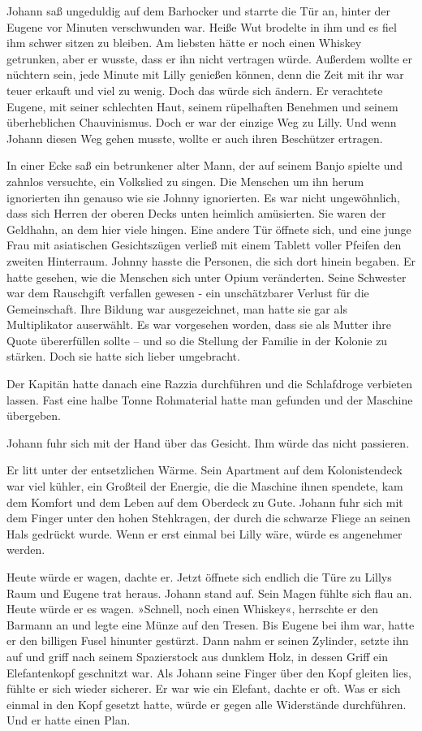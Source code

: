 Johann saß ungeduldig auf dem Barhocker und starrte die Tür an,
hinter der Eugene vor Minuten verschwunden war. Heiße Wut brodelte
in ihm und es fiel ihm schwer sitzen zu bleiben. Am liebsten hätte
er noch einen Whiskey getrunken, aber er wusste, dass er ihn nicht
vertragen würde. Außerdem wollte er nüchtern sein, jede Minute mit
Lilly genießen können, denn die Zeit mit ihr war teuer erkauft und
viel zu wenig. Doch das würde sich ändern. Er verachtete Eugene,
mit seiner schlechten Haut, seinem rüpelhaften Benehmen und seinem
überheblichen Chauvinismus. Doch er war der einzige Weg zu Lilly.
Und wenn Johann diesen Weg gehen musste, wollte er auch ihren
Beschützer ertragen.

In einer Ecke saß ein betrunkener alter Mann, der auf seinem Banjo
spielte und zahnlos versuchte, ein Volkslied zu singen. Die
Menschen um ihn herum ignorierten ihn genauso wie sie Johnny
ignorierten. Es war nicht ungewöhnlich, dass sich Herren der oberen
Decks unten heimlich amüsierten. Sie waren der Geldhahn, an dem
hier viele hingen. Eine andere Tür öffnete sich, und eine junge
Frau mit asiatischen Gesichtszügen verließ mit einem Tablett voller
Pfeifen den zweiten Hinterraum. Johnny hasste die Personen, die
sich dort hinein begaben. Er hatte gesehen, wie die Menschen sich
unter Opium veränderten. Seine Schwester war dem Rauschgift
verfallen gewesen - ein unschätzbarer Verlust für die Gemeinschaft.
Ihre Bildung war ausgezeichnet, man hatte sie gar als Multiplikator
auserwählt. Es war vorgesehen worden, dass sie als Mutter ihre
Quote übererfüllen sollte – und so die Stellung der Familie in der
Kolonie zu stärken. Doch sie hatte sich lieber umgebracht.

Der Kapitän hatte danach eine Razzia durchführen und die
Schlafdroge verbieten lassen. Fast eine halbe Tonne Rohmaterial
hatte man gefunden und der Maschine übergeben.

\bigpar

Johann fuhr sich mit der Hand über das Gesicht. Ihm würde das nicht
passieren.

\bigpar

Er litt unter der entsetzlichen Wärme. Sein Apartment auf dem
Kolonistendeck war viel kühler, ein Großteil der Energie, die die
Maschine ihnen spendete, kam dem Komfort und dem Leben auf dem
Oberdeck zu Gute. Johann fuhr sich mit dem Finger unter den hohen
Stehkragen, der durch die schwarze Fliege an seinen Hals gedrückt
wurde. Wenn er erst einmal bei Lilly wäre, würde es angenehmer
werden.

Heute würde er wagen, dachte er. Jetzt öffnete sich endlich die
Türe zu Lillys Raum und Eugene trat heraus. Johann stand auf. Sein
Magen fühlte sich flau an. Heute würde er es wagen. »Schnell, noch
einen Whiskey«, herrschte er den Barmann an und legte eine Münze
auf den Tresen. Bis Eugene bei ihm war, hatte er den billigen Fusel
hinunter gestürzt. Dann nahm er seinen Zylinder, setzte ihn auf und
griff nach seinem Spazierstock aus dunklem Holz, in dessen Griff
ein Elefantenkopf geschnitzt war. Als Johann seine Finger über den
Kopf gleiten lies, fühlte er sich wieder sicherer. Er war wie ein
Elefant, dachte er oft. Was er sich einmal in den Kopf gesetzt
hatte, würde er gegen alle Widerstände durchführen. Und er hatte
einen Plan.


